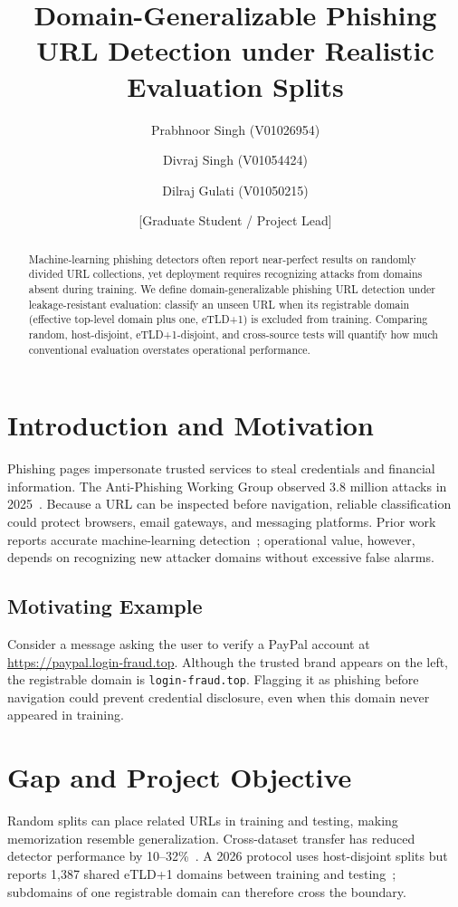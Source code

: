 \documentclass[sigconf,nonacm]{acmart}
\title{Domain-Generalizable Phishing URL Detection under Realistic Evaluation Splits}
\author{Prabhnoor Singh (V01026954)}
\affiliation{%
  \institution{University of Victoria}
  \city{Victoria}
  \country{Canada}}
\author{Divraj Singh (V01054424)}
\affiliation{%
  \institution{University of Victoria}
  \city{Victoria}
  \country{Canada}}
\author{Dilraj Gulati (V01050215)}
\affiliation{%
  \institution{University of Victoria}
  \city{Victoria}
  \country{Canada}}
\author{[Graduate Student / Project Lead]}
\affiliation{%
  \institution{University of Victoria}
  \city{Victoria}
  \country{Canada}}
\begin{document}
\begin{abstract}
Machine-learning phishing detectors often report near-perfect results on randomly divided URL collections, yet deployment requires recognizing attacks from domains absent during training. We define domain-generalizable phishing URL detection under leakage-resistant evaluation: classify an unseen URL when its registrable domain (effective top-level domain plus one, eTLD+1) is excluded from training. Comparing random, host-disjoint, eTLD+1-disjoint, and cross-source tests will quantify how much conventional evaluation overstates operational performance.
\end{abstract}

\maketitle

\section{Introduction and Motivation}
Phishing pages impersonate trusted services to steal credentials and financial information. The Anti-Phishing Working Group observed 3.8 million attacks in 2025~\cite{apwg2026}. Because a URL can be inspected before navigation, reliable classification could protect browsers, email gateways, and messaging platforms. Prior work reports accurate machine-learning detection~\cite{prasad2024}; operational value, however, depends on recognizing new attacker domains without excessive false alarms.

\subsection{Motivating Example}
Consider a message asking the user to verify a PayPal account at \url{https://paypal.login-fraud.top}. Although the trusted brand appears on the left, the registrable domain is \texttt{login-fraud.top}. Flagging it as phishing before navigation could prevent credential disclosure, even when this domain never appeared in training.

\section{Gap and Project Objective}
Random splits can place related URLs in training and testing, making memorization resemble generalization. Cross-dataset transfer has reduced detector performance by 10--32\%~\cite{rashid2024}. A 2026 protocol uses host-disjoint splits but reports 1,387 shared eTLD+1 domains between training and testing~\cite{ahamed2026}; subdomains of one registrable domain can therefore cross the boundary.
\end{document}
